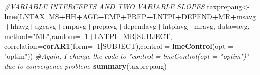 \documentclass[]{book}
\newenvironment{Shaded}{\begin{snugshade}}{\end{snugshade}}
\newcommand{\CommentTok}[1]{\textcolor[rgb]{0.56,0.35,0.01}{\textit{#1}}}
\newcommand{\DataTypeTok}[1]{\textcolor[rgb]{0.13,0.29,0.53}{#1}}
\newcommand{\DecValTok}[1]{\textcolor[rgb]{0.00,0.00,0.81}{#1}}
\newcommand{\KeywordTok}[1]{\textcolor[rgb]{0.13,0.29,0.53}{\textbf{#1}}}
\newcommand{\NormalTok}[1]{#1}
\newcommand{\OperatorTok}[1]{\textcolor[rgb]{0.81,0.36,0.00}{\textbf{#1}}}
\newcommand{\StringTok}[1]{\textcolor[rgb]{0.31,0.60,0.02}{#1}}
\begin{document}
\begin{Shaded}
\begin{Highlighting}[]
\CommentTok{#VARIABLE INTERCEPTS AND TWO VARIABLE SLOPES }
\NormalTok{taxprepaug<-}\KeywordTok{lme}\NormalTok{(LNTAX}\OperatorTok{~}\NormalTok{MS}\OperatorTok{+}\NormalTok{HH}\OperatorTok{+}\NormalTok{AGE}\OperatorTok{+}\NormalTok{EMP}\OperatorTok{+}\NormalTok{PREP}\OperatorTok{+}\NormalTok{LNTPI}\OperatorTok{+}\NormalTok{DEPEND}\OperatorTok{+}\NormalTok{MR}\OperatorTok{+}\NormalTok{msavg}\OperatorTok{+}\NormalTok{hhavg}\OperatorTok{+}\NormalTok{ageavg}\OperatorTok{+}\NormalTok{empavg}\OperatorTok{+}\NormalTok{prepavg}\OperatorTok{+}\NormalTok{dependavg}\OperatorTok{+}\NormalTok{lntpiavg}\OperatorTok{+}\NormalTok{mravg, }\DataTypeTok{data=}\NormalTok{avg, }\DataTypeTok{method=}\StringTok{"ML"}\NormalTok{,}\DataTypeTok{random=}\OperatorTok{~}\DecValTok{1}\OperatorTok{+}\NormalTok{LNTPI}\OperatorTok{+}\NormalTok{MR}\OperatorTok{|}\NormalTok{SUBJECT, }\DataTypeTok{correlation=}\KeywordTok{corAR1}\NormalTok{(}\DataTypeTok{form=}\OperatorTok{~}\DecValTok{1}\OperatorTok{|}\NormalTok{SUBJECT),}\DataTypeTok{control =} \KeywordTok{lmeControl}\NormalTok{(}\DataTypeTok{opt =} \StringTok{"optim"}\NormalTok{))  }
\CommentTok{#Again, I change the code to "control = lmeControl(opt = "optim")" due to convergence problem.}
\KeywordTok{summary}\NormalTok{(taxprepaug)}
\end{Highlighting}
\end{Shaded}
\end{document}

